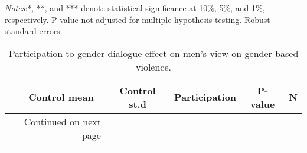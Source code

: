 \documentclass[10pt,a4paper, margin=1in]{article}
\begin{document}
\begin{center}
	{\tiny \tabcolsep=1pt  %
		\begin{ThreePartTable}
			\begin{TableNotes}[flushleft]
				\tiny
				\item \textit{Notes}:*, **, and *** denote statistical significance at 10\%, 5\%, and 1\%, respectively. P-value not adjusted for multiple hypothesis testing. Robust standard errors.
			\end{TableNotes}
			\begin{longtable}{l*{5}{c}}
				\caption{Participation to gender dialogue effect on men's view on gender based violence.}\label{tab:balance_omni}					\\
				\toprule
				\hline 
				&\multicolumn{1}{p{1cm}}{\centering Control mean}
				&\multicolumn{1}{p{1cm}}{\centering Control st.d}
				&\multicolumn{1}{p{2cm}}{\centering Participation}
				&\multicolumn{1}{p{1cm}}{\centering P-value}
				&\multicolumn{1}{p{1cm}}{\centering N} \\
				\hline 
				\endfirsthead
				\hline
				\endhead
				\hline
				\multicolumn{2}{r}{{Continued on next page}} \\
				\endfoot
				
				\bottomrule
				\insertTableNotes
				\endlastfoot
				
			\end{longtable}
		\end{ThreePartTable}
	}
\end{center}
\end{document}
